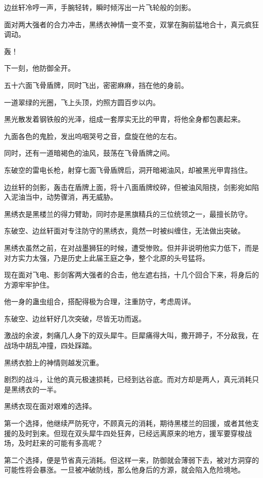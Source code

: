 \begin{this_body}
边丝轩冷哼一声，手腕轻转，瞬时倾泻出一片飞轮般的剑影。

面对两大强者的合力冲击，黑绣衣神情一变不变，双掌在胸前猛地合十，真元疯狂调动。

轰！

下一刻，他防御全开。

五十六面飞骨盾牌，同时飞出，密密麻麻，挡在他的身前。

一道翠绿的光圈，飞上头顶，灼照方圆百步以内。

黑光散发着钢铁般的光泽，组成一套厚实无比的甲胄，将他全身都包裹起来。

九面各色的鬼脸，发出呜咽哭号之音，盘旋在他的左右。

同时，还有一道暗褐色的油风，鼓荡在飞骨盾牌之间。

东破空的雷电长枪，射穿七面飞骨盾牌后，洞开暗褐油风，却被黑光甲胄挡住。

边丝轩的剑影，轰击在盾牌上面，将十八面盾牌绞碎，但被油风阻挠，剑影宛如陷入泥油当中，动势骤消，再无威胁。

黑绣衣是黑楼兰的得力臂助，同时亦是黑旗精兵的三位统领之一，最擅长防守。

东破空、边丝轩面对专注防守的黑绣衣，竟然一时被纠缠住，无法做出突破。

黑绣衣虽然之前，在对战墨狮狂的时候，遭受惨败。但并非说明他实力低下，而是对方实力太强，乃是历史上此届王庭之争，整个北原的头号猛将。

现在面对飞电、影剑客两大强者的合击，他左遮右挡，十几个回合下来，将身后的方源牢牢护住。

他一身的蛊虫组合，搭配得极为合理，注重防守，考虑周详。

东破空、边丝轩好几次突破，尽皆无功而返。

激战的余波，刺痛几人身下的双头犀牛。巨犀痛得大叫，撒开蹄子，不分敌我，在战场中胡乱冲撞，四处踩踏。

黑绣衣脸上的神情则越发沉重。

剧烈的战斗，让他的真元极速损耗，已经到达谷底。而对方却是两人，真元消耗只是黑绣衣的一半。

黑绣衣现在面对艰难的选择。

第一个选择，他继续严防死守，不顾真元的消耗，期待黑楼兰的回援，或者其他支援的及时到来。但现在双头犀牛四处狂奔，已经远离原来的地方，援军要穿梭战场，及时赶来的可能有多高呢？

第二个选择，便是节省真元消耗。但这样一来，防御就会薄弱下去，被对方洞穿的可能性将会暴涨。一旦被冲破防线，那么他身后的方源，就会陷入危险境地。


\end{this_body}
